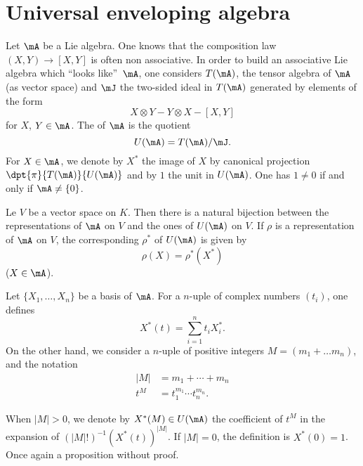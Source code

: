 \section{Universal enveloping algebra}  \label{subsec:env_alg}

Let $\mA$ be a Lie algebra. One knows that the composition law $(X,Y)\to[X,Y]$ is often non associative. In order to build an associative Lie algebra which ``looks like''\ $\mA$, one considers $T(\mA)$, the tensor algebra of $\mA$ (as vector space) and $\mJ$ the two-sided ideal in $T(\mA)$ generated by elements of the form
\[
	X\otimes Y-Y\otimes X -[X,Y]
\]
for $X$, $Y\in\mA$. The  of $\mA$ is the quotient 
\begin{equation}
	U(\mA)=T(\mA)/\mJ.
\end{equation}
For $X\in\mA$, we denote by $X^*$ the image of $X$ by canonical projection $\dpt{\pi}{T(\mA)}{U(\mA)}$ and by $1$ the unit in $U(\mA)$. One has $1\neq 0$ if and only if $\mA\neq\{0\}$.

\begin{proposition}
	Le $V$ be a vector space on $K$. Then there is a natural bijection between the representations of $\mA$ on $V$ and the ones of $U(\mA)$ on $V$. If $\rho$ is a representation of $\mA$ on $V$, the corresponding $\rho^*$ of $U(\mA)$ is given by
	\[
		\rho(X)=\rho^*(X^*)
	\]
	($X\in\mA$).
\end{proposition}

Let $\{X_1,\ldots,X_n\}$ be a basis of $\mA$. For a $n$-uple of complex numbers $(t_i)$, one defines
\begin{equation}
	X^*(t)=\sum_{i=1}^nt_iX^*_i.
\end{equation}
On the other hand, we consider a $n$-uple of positive integers $M=(m_1+\ldots m_n)$, and the notation
\begin{equation}
	\begin{split}
		|M|&=m_1+\cdots+m_n\\
		t^M&=t_1^{m_1}\cdots t_n^{m_n}.
	\end{split}
\end{equation}

When $|M|>0$, we denote by $X^*(M)\in U(\mA)$ the coefficient of $t^M$ in the expansion of $(|M|!)^{-1} (X^*(t))^{|M|}$. If $|M|=0$, the definition is $X^*(0)=1$. Once again a proposition without proof.

